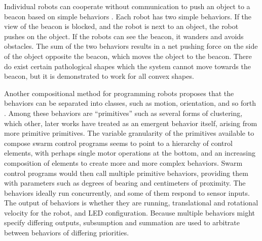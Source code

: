 \documentclass[]{article}
\begin{document}
Individual robots can cooperate without communication to push an object to a beacon based on simple behaviors \cite{chen2015occlusion}. 
Each robot has two simple behaviors.
If the view of the beacon is blocked, and the robot is next to an object, the robot pushes on the object.
If the robots can see the beacon, it wanders and avoids obstacles. 
The sum of the two behaviors results in a net pushing force on the side of the object opposite the beacon, which moves the object to the beacon. 
There do exist certain pathological shapes which the system cannot move towards the beacon, but it is demonstrated to work for all convex shapes. 

Another compositional method for programming robots proposes that the behaviors can be separated into classes, such as motion, orientation, and so forth \cite{mclurkin2004stupid}. 
Among these behaviors are ``primitives'' such as several forms of clustering, which other, later works have treated as an emergent behavior itself, arising from more primitive primitives. 
The variable granularity of the primitives available to compose swarm control programs seems to point to a hierarchy of control elements, with perhaps single motor operations at the bottom, and an increasing composition of elements to create more and more complex behaviors.
Swarm control programs would then call multiple primitive behaviors, providing them with parameters such as degrees of bearing and centimeters of proximity. 
The behaviors ideally run concurrently, and some of them respond to sensor inputs. 
The output of behaviors is whether they are running, translational and rotational velocity for the robot, and LED configuration. 
Because multiple behaviors might specify differing outputs, subsumption and summation are used to arbitrate between behaviors of differing priorities. 
\end{document}
